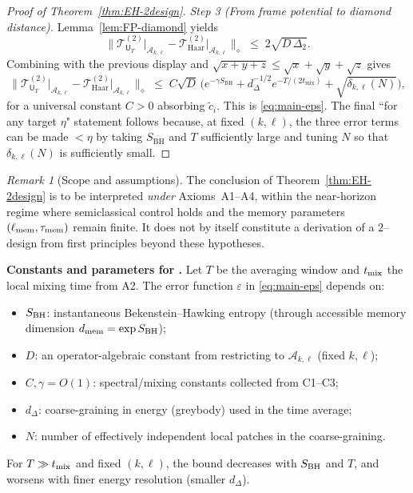 \documentclass[a4paper,11pt]{article}
\newenvironment{boxedresult}[1]{\begin{infobox}\noindent\textbf{#1.}}{\end{infobox}}
\theoremstyle{plain}
\theoremstyle{definition}
\theoremstyle{remark}
\newtheorem{remark}{Remark}
\begin{document}
\begin{proof}[Proof of Theorem~\ref{thm:EH-2design}]
\emph{Step 3 (From frame potential to diamond distance).} Lemma~\ref{lem:FP-diamond} yields
\begin{equation*}
 \Big\| \mathcal{T}^{(2)}_{\mathsf{U}_T}\big|_{\mathscr{A}_{k,\ell}} - \mathcal{T}^{(2)}_{\mathrm{Haar}}\big|_{\mathscr{A}_{k,\ell}} \Big\|_{\diamond}
 \;\le\; 2\sqrt{D\,\Delta_2}.
\end{equation*}
Combining with the previous display and $\sqrt{x+y+z}\le \sqrt{x}+\sqrt{y}+\sqrt{z}$ gives
\begin{equation*}
 \Big\| \mathcal{T}^{(2)}_{\mathsf{U}_T}\big|_{\mathscr{A}_{k,\ell}} - \mathcal{T}^{(2)}_{\mathrm{Haar}}\big|_{\mathscr{A}_{k,\ell}} \Big\|_{\diamond}
 \;\le\; C \sqrt{D}\,\Big( e^{-\gamma S_{\mathrm{BH}}} + d_\Delta^{-1/2} e^{-T/(2t_{\mathrm{mix}})} + \sqrt{\delta_{k,\ell}(N)} \Big),
\end{equation*}
for a universal constant $C>0$ absorbing $\tilde c_i$. This is \eqref{eq:main-eps}. The final ``for any target $\eta$" statement
follows because, at fixed $(k,\ell)$, the three error terms can be made $<\eta$ by taking $S_{\mathrm{BH}}$ and $T$ sufficiently
large and tuning $N$ so that $\delta_{k,\ell}(N)$ is sufficiently small.
\end{proof}
\begin{remark}[Scope and assumptions]
The conclusion of Theorem~\ref{thm:EH-2design} is to be interpreted \emph{under} Axioms~A1--A4, within the near-horizon regime where semiclassical control holds and the memory parameters $(\ell_{\rm mem},\tau_{\rm mem})$ remain finite. It does not by itself constitute a derivation of a $2$--design from first principles beyond these hypotheses.
\end{remark}

\begin{boxedresult}{Constants and parameters for \Cref{thm:EH-2design}}\label{box:constants-eps}
Let $T$ be the averaging window and $t_{\rm mix}$ the local mixing time from A2. The error function $\varepsilon$ in \eqref{eq:main-eps} depends on:
\begin{itemize}[leftmargin=*,itemsep=0.2em]
  \item $S_{\rm BH}$: instantaneous Bekenstein--Hawking entropy (through accessible memory dimension $d_{\rm mem}=\exp S_{\rm BH}$);
  \item $D$: an operator-algebraic constant from restricting to $\mathscr{A}_{k,\ell}$ (fixed $k,\ell$);
  \item $C,\gamma = O(1)$: spectral/mixing constants collected from C1--C3;
  \item $d_\Delta$: coarse-graining in energy (greybody) used in the time average;
  \item $N$: number of effectively independent local patches in the coarse-graining.
\end{itemize}
For $T\gg t_{\rm mix}$ and fixed $(k,\ell)$, the bound decreases with $S_{\rm BH}$ and $T$, and worsens with finer energy resolution (smaller $d_\Delta$).
\end{boxedresult}
\end{document}
